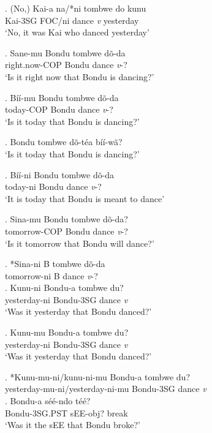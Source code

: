 \documentclass{assets/fieldnotes}
\begin{document}
\exg. (No,) Kai-a na/*ni tombwe do kunu\\
{} Kai-3SG FOC/ni dance \textit{v} yesterday\\
`No, it was Kai who danced yesterday'\\

\exg. San\textipa{\textbardotlessj}e-mu Bondu tombwe dõ-da\\
right.now-COP Bondu dance \textit{v}-?\\
`Is it right now that Bondu is dancing?'

\exg. Bíí-mu Bondu tombwe dõ-da\\
today-COP Bondu dance \textit{v}-?\\
`Is it today that Bondu is dancing?'

\exg. Bondu tombwe dõ-téa bíí-wã?\\

`Is it today that Bondu is dancing?' 

\exg. Bíí-ni Bondu tombwe dõ-da\\
today-ni Bondu dance \textit{v}-?\\
`It is today that Bondu is meant to dance'

\exg. Sina-mu Bondu tombwe dõ-da?\\
tomorrow-COP Bondu dance \textit{v}-?\\
`Is it tomorrow that Bondu will dance?'

\exg. *Sina-ni B tombwe dõ-da\\
tomorrow-ni B dance \textit{v}-?\\

\exg. Kunu-ni Bondu-a tombwe du?\\
yesterday-ni Bondu-3SG dance \textit{v}\\
`Was it yesterday that Bondu danced?'

\exg. Kunu-mu Bondu-a tombwe du?\\
yesterday-ni Bondu-3SG dance \textit{v}\\
`Was it yesterday that Bondu danced?'

\exg. *Kunu-mu-ni/kunu-ni-mu Bondu-a tombwe du?\\
yesterday-mu-ni/yesterday-ni-mu Bondu-3SG dance \textit{v}\\

\exg. Bondu-a séé-ndo téé?\\
Bondu-3SG.PST sEE-obj? break\\
`Was it the sEE that Bondu broke?'
\end{document}

